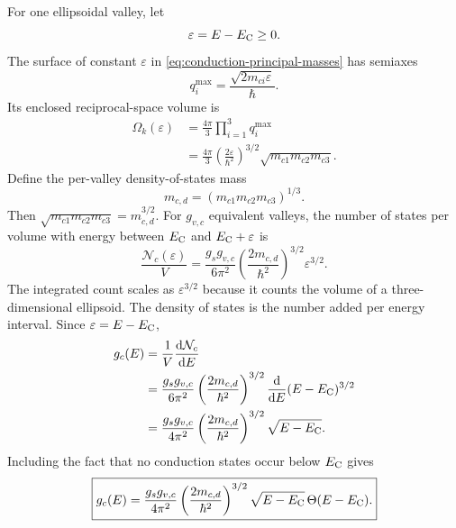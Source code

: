 For one ellipsoidal valley, let
\begin{equation}
  \varepsilon=E-E_{\mathrm C}\ge0.
  \label{eq:conduction-edge-energy}
\end{equation}
The surface of constant $\varepsilon$ in
\cref{eq:conduction-principal-masses} has semiaxes
\begin{equation}
  q_i^{\max}
  =\frac{\sqrt{2m_{ci}\varepsilon}}{\hbar}.
  \label{eq:constant-energy-ellipsoid-axes}
\end{equation}
Its enclosed reciprocal-space volume is
\begin{equation}
\begin{aligned}
  \Omega_k(\varepsilon)
  &=\frac{4\pi}{3}
    \prod_{i=1}^{3}q_i^{\max}\\
  &=\frac{4\pi}{3}
    \left(\frac{2\varepsilon}{\hbar^2}\right)^{3/2}
    \sqrt{m_{c1}m_{c2}m_{c3}}.
\end{aligned}
  \label{eq:ellipsoid-k-volume}
\end{equation}
Define the per-valley density-of-states mass
\begin{equation}
  m_{c,d}
  =\left(m_{c1}m_{c2}m_{c3}\right)^{1/3}.
  \label{eq:conduction-dos-mass}
\end{equation}
Then $\sqrt{m_{c1}m_{c2}m_{c3}}=m_{c,d}^{3/2}$.
For $g_{v,c}$ equivalent valleys, the number of states per volume with energy
between $E_{\mathrm C}$ and $E_{\mathrm C}+\varepsilon$ is
\begin{equation}
  \frac{\mathcal N_c(\varepsilon)}{V}
  =\frac{g_sg_{v,c}}{6\pi^2}
   \left(\frac{2m_{c,d}}{\hbar^2}\right)^{3/2}
   \varepsilon^{3/2}.
  \label{eq:integrated-conduction-state-count}
\end{equation}
The integrated count scales as $\varepsilon^{3/2}$ because it counts the
volume of a three-dimensional ellipsoid.  The density of states is the number
added per energy interval.  Since $\varepsilon=E-E_{\mathrm C}$,
\begin{equation}
\begin{aligned}
  g_c(E)
  &=\frac{1}{V}\frac{\mathop{}\!\mathrm{d}\mathcal N_c}{\mathop{}\!\mathrm{d} E}\\
  &=\frac{g_sg_{v,c}}{6\pi^2}
    \left(\frac{2m_{c,d}}{\hbar^2}\right)^{3/2}
    \frac{\mathop{}\!\mathrm{d}}{\mathop{}\!\mathrm{d} E}(E-E_{\mathrm C})^{3/2}\\
  &=\frac{g_sg_{v,c}}{4\pi^2}
    \left(\frac{2m_{c,d}}{\hbar^2}\right)^{3/2}
    \sqrt{E-E_{\mathrm C}}.
\end{aligned}
  \label{eq:conduction-dos-differentiation}
\end{equation}
Including the fact that no conduction states occur below $E_{\mathrm C}$ gives
\begin{equation}
  \boxed{
  g_c(E)
  =\frac{g_sg_{v,c}}{4\pi^2}
   \left(\frac{2m_{c,d}}{\hbar^2}\right)^{3/2}
   \sqrt{E-E_{\mathrm C}}\,\Theta(E-E_{\mathrm C}).
  }
  \label{eq:conduction-density-of-states}
\end{equation}

